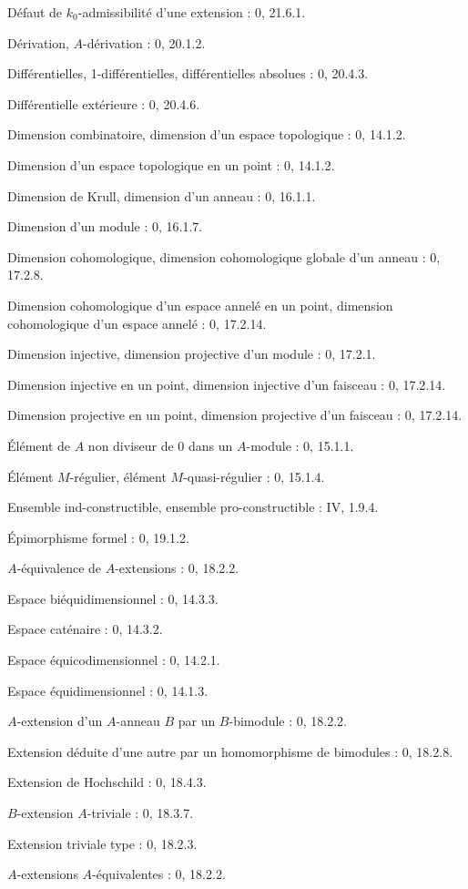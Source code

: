 Défaut de $k_0$-admissibilité d'une extension : 0, 21.6.1.\par
Dérivation, $A$-dérivation : 0, 20.1.2.\par
Différentielles, 1-différentielles, différentielles absolues : 0, 20.4.3.\par
Différentielle extérieure : 0, 20.4.6.\par
Dimension combinatoire, dimension d'un espace topologique : 0, 14.1.2.\par
Dimension d'un espace topologique en un point : 0, 14.1.2.\par
Dimension de Krull, dimension d'un anneau : 0, 16.1.1.\par
Dimension d'un module : 0, 16.1.7.\par
Dimension cohomologique, dimension cohomologique globale d'un anneau : 0, 17.2.8.\par
Dimension cohomologique d'un espace annelé en un point, dimension cohomologique d'un espace annelé : 0, 17.2.14.\par

\clearpage
{}
Dimension injective, dimension projective d'un module : 0, 17.2.1.\par
Dimension injective en un point, dimension injective d'un faisceau : 0, 17.2.14.\par
Dimension projective en un point, dimension projective d'un faisceau : 0, 17.2.14.\par

Élément de $A$ non diviseur de 0 dans un $A$-module : 0, 15.1.1.\par
Élément $M$-régulier, élément $M$-quasi-régulier : 0, 15.1.4.\par
Ensemble ind-constructible, ensemble pro-constructible : IV, 1.9.4.\par
Épimorphisme formel : 0, 19.1.2.\par
$A$-équivalence de $A$-extensions : 0, 18.2.2.\par
Espace biéquidimensionnel : 0, 14.3.3.\par
Espace caténaire : 0, 14.3.2.\par
Espace équicodimensionnel : 0, 14.2.1.\par
Espace équidimensionnel : 0, 14.1.3.\par
$A$-extension d'un $A$-anneau $B$ par un $B$-bimodule : 0, 18.2.2.\par
Extension déduite d'une autre par un homomorphisme de bimodules : 0, 18.2.8.\par
Extension de Hochschild : 0, 18.4.3.\par
$B$-extension $A$-triviale : 0, 18.3.7.\par
Extension triviale type : 0, 18.2.3.\par
$A$-extensions $A$-équivalentes : 0, 18.2.2.\par

